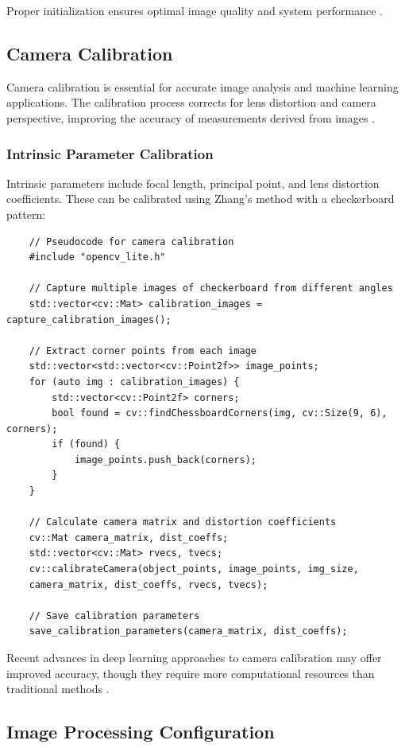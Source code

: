 Proper initialization ensures optimal image quality and system performance \cite{Arducam:2023}.

\subsection{Camera Calibration}
Camera calibration is essential for accurate image analysis and machine learning applications. The calibration process corrects for lens distortion and camera perspective, improving the accuracy of measurements derived from images \cite{Hagemann:2021}.

\subsubsection{Intrinsic Parameter Calibration}
Intrinsic parameters include focal length, principal point, and lens distortion coefficients. These can be calibrated using Zhang's method with a checkerboard pattern:

\begin{verbatim}
	// Pseudocode for camera calibration
	#include "opencv_lite.h"
	
	// Capture multiple images of checkerboard from different angles
	std::vector<cv::Mat> calibration_images = capture_calibration_images();
	
	// Extract corner points from each image
	std::vector<std::vector<cv::Point2f>> image_points;
	for (auto img : calibration_images) {
		std::vector<cv::Point2f> corners;
		bool found = cv::findChessboardCorners(img, cv::Size(9, 6), corners);
		if (found) {
			image_points.push_back(corners);
		}
	}
	
	// Calculate camera matrix and distortion coefficients
	cv::Mat camera_matrix, dist_coeffs;
	std::vector<cv::Mat> rvecs, tvecs;
	cv::calibrateCamera(object_points, image_points, img_size, 
	camera_matrix, dist_coeffs, rvecs, tvecs);
	
	// Save calibration parameters
	save_calibration_parameters(camera_matrix, dist_coeffs);
\end{verbatim}

Recent advances in deep learning approaches to camera calibration may offer improved accuracy, though they require more computational resources than traditional methods \cite{Wang:2019}.

\subsection{Image Processing Configuration}
